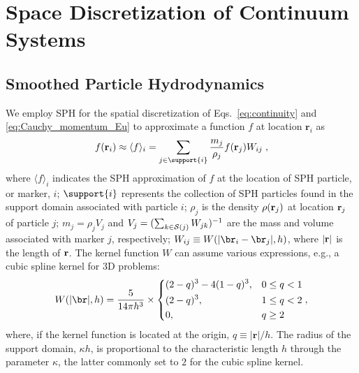 \section{Space Discretization of Continuum Systems}
\subsection {Smoothed Particle Hydrodynamics}\label{sec:SPH}
We employ SPH for the spatial discretization of Eqs.~\ref{eq:continuity} and \ref{eq:Cauchy_momentum_Eu} to approximate a function $f$ at location $\mathbf r_i$ as \cite{Monaghan2005a}
\begin{equation}\label{eq:SPH_f}
f(\mathbf r_i) \approx  \langle f\rangle_i= \sum_{j \in \support{i}} \frac{m_j}{\rho_j}f(\mathbf r_j)W_{ij} \; ,
\end{equation}
where $\langle f \rangle_i$ indicates the SPH approximation of $f$ at the location of SPH particle, or marker, $i$;  $\support{i}$ represents the collection of SPH particles found in the support domain associated with particle $i$; $\rho_j$ is the density $\rho({\bf r}_j)$ at location ${\bf r}_j$ of particle $j$; $m_j=\rho_j V_j$ and $V_j=(\sum_{k \in {\cal S}(j)} W_{jk})^{-1}$ are the mass and volume associated with marker $j$, respectively; $W_{ij}\equiv W(|\br_i-\br_j|,h)$, where $|{\bf r}|$ is the length of ${\bf r}$. The kernel function $W$ can assume various expressions, e.g., a cubic spline kernel for 3D problems:
\begin{equation} 
\label{eq:kernelExample}
W(|\br|,h) = \frac{5}{{14\pi {h^3}}} \times \left\{ \begin{aligned}
&{(2 - q)^3} - 4{(1 - q)^3}, && 0 \le q < 1 \\ 
&{(2 - q)^3}, && 1 \le q < 2 \\ 
&0, && q \ge 2 \\ 
\end{aligned} \right.,
\end{equation}
where, if the kernel function is located at the origin, $q\equiv | \mathbf{r} | / h$.  The radius of the support domain, $\kappa h$, is proportional to the characteristic length $h$ through the parameter $\kappa$, the latter commonly set to $2$ for the cubic spline kernel.

